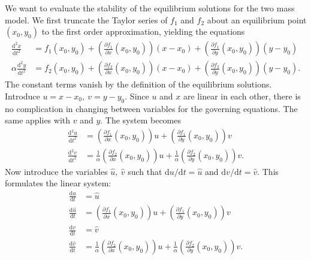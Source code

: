 \documentclass{report}
\begin{document}
We want to evaluate the stability of the equilibrium solutions for the two mass model.
We first truncate the Taylor series of \(f_1\) and \(f_2\) about an equilibrium point \((x_0,y_0)\) to the first order approximation, yielding the equations
\begin{equation}
    \begin{aligned}
        \frac{\mathrm{d}^2x}{\mathrm{d}t^2} &= f_1(x_0,y_0) + \left(\frac{\partial f_1}{\partial x}(x_0,y_0)\right)(x-x_0) + \left(\frac{\partial f_1}{\partial y}(x_0,y_0)\right)(y-y_0) \\
        \alpha\frac{\mathrm{d}^2y}{\mathrm{d}t^2} &= f_2(x_0,y_0) + \left(\frac{\partial f_2}{\partial x}(x_0,y_0)\right)(x-x_0) + \left(\frac{\partial f_2}{\partial y}(x_0,y_0)\right)(y-y_0).
    \end{aligned}
\end{equation}
The constant terms vanish by the definition of the equilibrium solutions.
Introduce \(u = x-x_0,~v=y-y_0\).
Since $u$ and $x$ are linear in each other, there is no complication in changing between variables for the governing equations.
The same applies with $v$ and $y$.
The system becomes
\begin{equation}
    \begin{aligned}
        \frac{\mathrm{d}^2u}{\mathrm{d}t^2} &= \left(\frac{\partial f_1}{\partial x}(x_0,y_0)\right)u + \left(\frac{\partial f_1}{\partial y}(x_0,y_0)\right)v \\
        \frac{\mathrm{d}^2v}{\mathrm{d}t^2} &= \frac{1}{\alpha}\left(\frac{\partial f_2}{\partial x}(x_0,y_0)\right)u + \frac{1}{\alpha}\left(\frac{\partial f_2}{\partial y}(x_0,y_0)\right)v.
    \end{aligned}
\end{equation}
Now introduce the variables $\hat{u},~\hat{v}$ such that \(\mathrm{d}u/\mathrm{d}t = \hat{u}\) and \(\mathrm{d}v/\mathrm{d}t = \hat{v}\). This formulates the linear system:
\begin{equation}
    \begin{aligned}
        \frac{\mathrm{d}u}{\mathrm{d}t} &= \hat{u} \\
        \frac{\mathrm{d}\hat{u}}{\mathrm{d}t} &= \left(\frac{\partial f_1}{\partial x}(x_0,y_0)\right)u + \left(\frac{\partial f_1}{\partial y}(x_0,y_0)\right)v \\
        \frac{\mathrm{d}v}{\mathrm{d}t} &= \hat{v} \\
        \frac{\mathrm{d}\hat{v}}{\mathrm{d}t} &= \frac{1}{\alpha}\left(\frac{\partial f_2}{\partial x}(x_0,y_0)\right)u + \frac{1}{\alpha}\left(\frac{\partial f_2}{\partial y}(x_0,y_0)\right)v.
    \end{aligned}
\end{equation}
\end{document}
